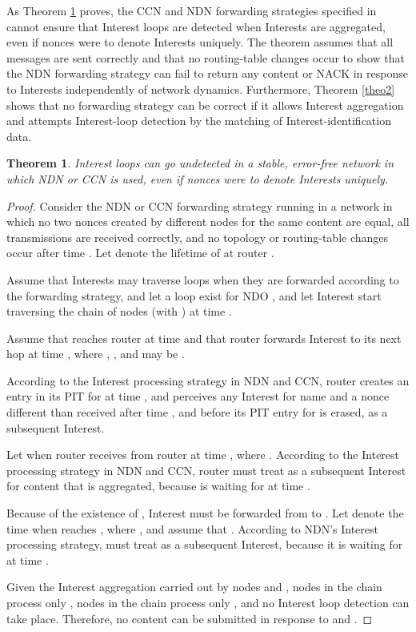 \documentclass{ancs15-alternate}
\newtheorem{theorem}{Theorem}
\begin{document}
 
As Theorem \ref{theo1} proves,  the CCN and NDN forwarding strategies specified in \cite{ccn, ndn-fw2, ndn-paper} 
cannot ensure that Interest loops are detected  when Interests are aggregated, even if nonces were to denote Interests uniquely. The theorem assumes that all messages are sent correctly and that no routing-table changes occur  to show  that the NDN forwarding strategy can fail to return any content or NACK in response to Interests independently of network dynamics.  Furthermore, Theorem \ref{theo2} shows that no forwarding strategy can be correct if it allows Interest aggregation and attempts  Interest-loop detection by the matching of Interest-identification data.

\begin{theorem}
\label{theo1}
Interest loops can go undetected in a stable, error-free network in which  NDN or CCN  is used, even if nonces were to denote Interests uniquely.
\end{theorem}

\begin{proof}
Consider the NDN or CCN forwarding strategy running in a network in which 
no two nonces created by different nodes for the same content are equal, 
all transmissions are received correctly,  and no topology or routing-table changes occur after time . 
Let  denote the lifetime of  at router . 

Assume that  Interests may traverse loops when they are forwarded according to the forwarding strategy, and
let a loop      exist for NDO , and let  Interest  start traversing the chain of nodes  
     (with ) at time .

Assume that  reaches router  at time  and that router  forwards Interest  to its next hop   at time , where ,  , and  may be . 

According to the Interest processing strategy in NDN and CCN, router  creates an entry in its PIT for  at time , and perceives any Interest for name  and a  nonce different than  received after time , and before its PIT entry 
for  is erased, as a subsequent Interest. 


Let  when router  receives  from router   at time , where . 
According to the  Interest processing strategy in NDN and CCN, router   must treat 
 as  a subsequent Interest for content  that is aggregated, 
because  is waiting for  at time .

Because of   the existence of , Interest  must be forwarded from  to . Let  denote the time when   reaches , where 
, and  assume that . 
According to NDN's Interest processing strategy,  must treat  as a subsequent Interest, because it is waiting for  at time .

Given the Interest aggregation carried out by nodes  and ,  nodes in the chain  process only 
,  nodes in the chain    process only , and no Interest loop detection can take place. 
Therefore,  no content can be submitted in response to  and .
\end{proof}
\end{document}
